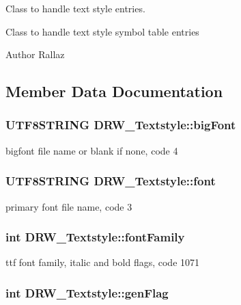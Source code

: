 Class to handle text style entries. 

Class to handle text style symbol table entries \begin{DoxyAuthor}{Author}
Rallaz 
\end{DoxyAuthor}


\subsection{Member Data Documentation}
\hypertarget{classDRW__Textstyle_a5e5bee24192efcdc25e2922c2639a73e}{
\subsubsection[{big\-Font}]{\setlength{\rightskip}{0pt plus 5cm}U\-T\-F8\-S\-T\-R\-I\-N\-G D\-R\-W\-\_\-\-Textstyle\-::big\-Font}}\label{classDRW__Textstyle_a5e5bee24192efcdc25e2922c2639a73e}
bigfont file name or blank if none, code 4 \hypertarget{classDRW__Textstyle_ac04f9a321fbb47a3adc3aaf65b30f02b}{
\subsubsection[{font}]{\setlength{\rightskip}{0pt plus 5cm}U\-T\-F8\-S\-T\-R\-I\-N\-G D\-R\-W\-\_\-\-Textstyle\-::font}}\label{classDRW__Textstyle_ac04f9a321fbb47a3adc3aaf65b30f02b}
primary font file name, code 3 \hypertarget{classDRW__Textstyle_a40ef37c402a0f1b75f481be925c85357}{
\subsubsection[{font\-Family}]{\setlength{\rightskip}{0pt plus 5cm}int D\-R\-W\-\_\-\-Textstyle\-::font\-Family}}\label{classDRW__Textstyle_a40ef37c402a0f1b75f481be925c85357}
ttf font family, italic and bold flags, code 1071 \hypertarget{classDRW__Textstyle_adec337333f98e34908076b2b1a0a10a0}{
\subsubsection[{gen\-Flag}]{\setlength{\rightskip}{0pt plus 5cm}int D\-R\-W\-\_\-\-Textstyle\-::gen\-Flag}}\label{classDRW__Textstyle_adec337333f98e34908076b2b1a0a10a0}
